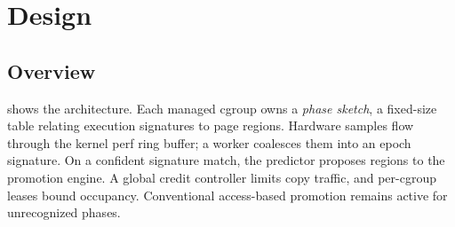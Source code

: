 \section{Design}
\label{sec:design}

\subsection{Overview}

 shows the architecture.  Each managed cgroup owns a
\emph{phase sketch}, a fixed-size table relating execution signatures to page
regions.  Hardware samples flow through the kernel perf ring buffer; a worker
coalesces them into an epoch signature.  On a confident signature match, the
predictor proposes regions to the promotion engine.  A global credit controller
limits copy traffic, and per-cgroup leases bound occupancy.  Conventional
access-based promotion remains active for unrecognized phases.

